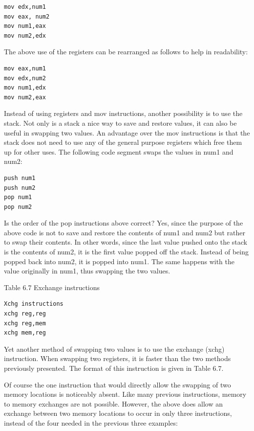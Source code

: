 \documentclass[10pt]{article}
\begin{document}
\begin{verbatim}
mov edx,num1
mov eax, num2
mov num1,eax
mov num2,edx
\end{verbatim}

The above use of the registers can be rearranged as follows to help in readability:

\begin{verbatim}
mov eax,num1
mov edx,num2
mov num1,edx
mov num2,eax
\end{verbatim}

Instead of using registers and mov instructions, another possibility is to use the stack. Not only is a stack a nice way to save and restore values, it can also be useful in swapping two values. An advantage over the mov instructions is that the stack does not need to use any of the general purpose registers which free them up for other uses. The following code segment swaps the values in num1 and num2:

\begin{verbatim}
push num1
push num2
pop num1
pop num2
\end{verbatim}

Is the order of the pop instructions above correct? Yes, since the purpose of the above code is not to save and restore the contents of num1 and num2 but rather to swap their contents. In other words, since the last value pushed onto the stack is the contents of num2, it is the first value popped off the stack. Instead of being popped back into num2, it is popped into num1. The same happens with the value originally in num1, thus swapping the two values.

Table 6.7 Exchange instructions

\begin{verbatim}
Xchg instructions
xchg reg,reg
xchg reg,mem
xchg mem,reg
\end{verbatim}

Yet another method of swapping two values is to use the exchange (xchg) instruction. When swapping two registers, it is faster than the two methods previously presented. The format of this instruction is given in Table 6.7.

Of course the one instruction that would directly allow the swapping of two memory locations is noticeably absent. Like many previous instructions, memory to memory exchanges are not possible. However, the above does allow an exchange between two memory locations to occur in only three instructions, instead of the four needed in the previous three examples:
\end{document}
